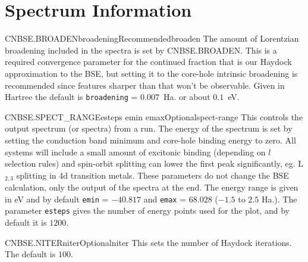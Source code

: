 \documentclass[11pt]{report}
\begin{document}
\section{Spectrum Information}
\label{sec:Spectrum-Information}
\begin{Card}{CNBSE.BROADEN}{broadening}{Recommended}{broaden}
The amount of Lorentzian broadening included in the spectra is set by CNBSE.BROADEN. This is a required convergence parameter for the continued fraction that is our Haydock approximation to the BSE, but setting it to the core-hole intrinsic broadening is recommended since features sharper than that won't be observable. Given in Hartree the default is \texttt{broadening} = $0.007$~Ha. or about $0.1$~eV.
\end{Card}

\begin{Card}{CNBSE.SPECT\_RANGE}{esteps emin emax}{Optional}{spect-range}
This controls the output spectrum (or spectra) from a run. The energy of the spectrum is set by setting the conduction band minimum and core-hole binding energy to zero. All systems will include a small amount of excitonic binding (depending on $l$ selection rules) and spin-orbit splitting can lower the first peak significantly, eg. L$_{2,3}$ splitting in 4d transition metals. These parameters do not change the BSE calculation, only the output of the spectra at the end. The energy range is given in eV and by default \texttt{emin} = $-40.817$ and \texttt{emax} = $68.028$ ($-1.5$ to $2.5$ Ha.). The parameter \texttt{esteps} gives the number of energy points used for the plot, and by default it is $1200$.
\end{Card}

\begin{Card}{CNBSE.NITER}{niter}{Optional}{niter}
This sets the number of Haydock iterations. The default is $100$.
\end{Card}






%
\end{document}
